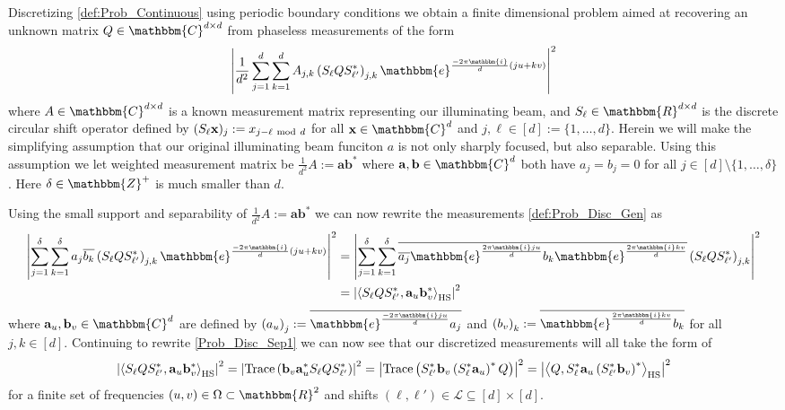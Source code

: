 \documentclass[]{spie}  %
\def \a {\mathbf a}
\def \b {\mathbf b}
\def \x {\mathbf x}
\def \e { \mathbbm{e}}
\def \i { \mathbbm{i}}
\begin{document}
Discretizing \eqref{def:Prob_Continuous} using periodic boundary conditions we obtain a finite dimensional problem aimed at recovering an unknown matrix $Q \in \mathbbm{C}^{d \times d}$ from phaseless measurements of the form
\begin{equation}
\left| \frac{1}{d^2} \sum^d_{j=1} \sum^d_{k=1} A_{j,k} \left(S_{\ell}QS^*_{\ell'}\right)_{j,k} \e^{\frac{-2\pi \i}{d}(ju + kv)} \right|^2
\label{def:Prob_Disc_Gen}
\end{equation}
where $A \in \mathbbm{C}^{d \times d}$ is a known measurement matrix representing our illuminating beam, and $S_\ell \in \mathbbm{R}^{d \times d}$ is the discrete circular shift operator defined by $(S_\ell \x)_j := x_{j-\ell ~{\rm mod}~ d}$ for all $\x \in \mathbbm{C}^d$ and $j,\ell \in [d] := \{ 1, \dots, d\}$.  Herein we will make the simplifying assumption that our original illuminating beam funciton $a$ is not only sharply focused, but also separable.  Using this assumption we let weighted measurement matrix be $\frac{1}{d^2} A := \a \b^*$ where $\a,\b \in \mathbbm{C}^d$ both have $a_j = b_j = 0$ for all $j \in [d] \setminus \{ 1, \dots, \delta \}$.  Here $\delta \in \mathbbm{Z}^+$ is much smaller than $d$.

Using the small support and separability of $\frac{1}{d^2} A := \a \b^*$ we can now rewrite the measurements \eqref{def:Prob_Disc_Gen} as
\begin{align}
\left| \sum^\delta_{j=1} \sum^\delta_{k=1} a_j \overline{b_k} \left(S_{\ell}QS^*_{\ell'}\right)_{j,k} \e^{\frac{-2\pi \i}{d}(ju + kv)} \right|^2 &= \left| \sum^\delta_{j=1} \sum^\delta_{k=1} \overline{\overline{a_j}\e^{\frac{2 \pi \i j u}{d}}  b_k \e^{\frac{2 \pi \i k v}{d}}} \left(S_{\ell}QS^*_{\ell'}\right)_{j,k} \right|^2 \nonumber \\
&= \left| \left\langle S_{\ell}QS^*_{\ell'}, \a_u \b^*_v \right\rangle_{\rm HS} \right|^2
\label{Prob_Disc_Sep1}
\end{align}
where $\a_u, \b_v \in \mathbbm{C}^d$ are defined by $\left( a_u \right)_j := \overline{\e^{\frac{-2 \pi \i j u}{d}} a_j}$ and $\left( b_v \right)_k := \overline{\e^{\frac{2 \pi \i k v}{d}} b_k}$ for all $j,k \in [d]$.  Continuing to rewrite \eqref{Prob_Disc_Sep1} we can now see that our discretized measurements will all take the form of 
\begin{equation}
\left| \left\langle S_{\ell}QS^*_{\ell'}, \a_u \b^*_v \right\rangle_{\rm HS} \right|^2 = \left| {\rm Trace}\left( \b_v \a^*_u S_{\ell}QS^*_{\ell'} \right) \right|^2 = \left| {\rm Trace}\left( S^*_{\ell'} \b_v  \left(S^*_{\ell} \a_u \right)^*Q \right) \right|^2 = \left| \left\langle Q, S^*_{\ell} \a_u \left(S^*_{\ell'} \b_v \right)^* \right\rangle_{\rm HS} \right|^2
\label{Prob_Disc}
\end{equation}
for a finite set of frequencies $(u,v) \in \Omega \subset \mathbbm{R}^2$ and shifts $(\ell,\ell') \in \mathcal{L} \subseteq [d] \times [d]$.
\end{document}
